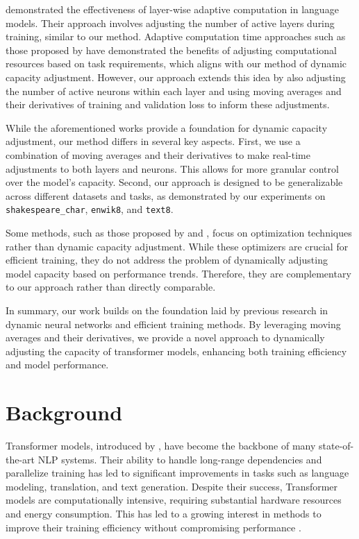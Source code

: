 \documentclass{article} %
\begin{document}
\citet{radford2019language} demonstrated the effectiveness of layer-wise adaptive computation in language models. Their approach involves adjusting the number of active layers during training, similar to our method. Adaptive computation time approaches such as those proposed by \citet{Graves2016AdaptiveCT} have demonstrated the benefits of adjusting computational resources based on task requirements, which aligns with our method of dynamic capacity adjustment. However, our approach extends this idea by also adjusting the number of active neurons within each layer and using moving averages and their derivatives of training and validation loss to inform these adjustments.

While the aforementioned works provide a foundation for dynamic capacity adjustment, our method differs in several key aspects. First, we use a combination of moving averages and their derivatives to make real-time adjustments to both layers and neurons. This allows for more granular control over the model's capacity. Second, our approach is designed to be generalizable across different datasets and tasks, as demonstrated by our experiments on \texttt{shakespeare\_char}, \texttt{enwik8}, and \texttt{text8}.

Some methods, such as those proposed by \citet{kingma2014adam} and \citet{loshchilov2017adamw}, focus on optimization techniques rather than dynamic capacity adjustment. While these optimizers are crucial for efficient training, they do not address the problem of dynamically adjusting model capacity based on performance trends. Therefore, they are complementary to our approach rather than directly comparable.

In summary, our work builds on the foundation laid by previous research in dynamic neural networks and efficient training methods. By leveraging moving averages and their derivatives, we provide a novel approach to dynamically adjusting the capacity of transformer models, enhancing both training efficiency and model performance.

\section{Background}
\label{sec:background}

Transformer models, introduced by \citet{vaswani2017attention}, have become the backbone of many state-of-the-art NLP systems. Their ability to handle long-range dependencies and parallelize training has led to significant improvements in tasks such as language modeling, translation, and text generation. Despite their success, Transformer models are computationally intensive, requiring substantial hardware resources and energy consumption. This has led to a growing interest in methods to improve their training efficiency without compromising performance \citep{Kaddour2023NoTN, radford2019language}.
\end{document}
